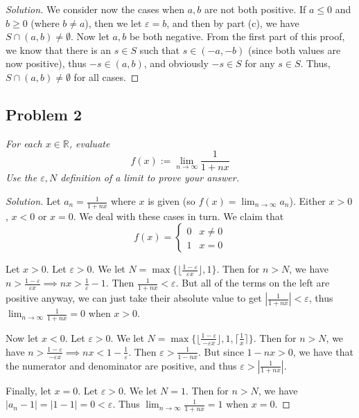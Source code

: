 \documentclass{article}
\newcommand{\R}{{\mathbb R}}
\newcommand{\ep}{{\varepsilon}}
\begin{document}
\begin{enumerate}
\begin{proof}[Solution]
		We consider now the cases when $a,b$ are not both positive.
		If $a \leq 0$ and $b \geq 0$ (where $b \neq a$),
		then we let $\ep = b$, and then by part (c),
		we have $S \cap (a,b) \neq \emptyset$.
		Now let $a,b$ be both negative.
		From the first part of this proof, we know that there is an $s \in S$
		such that $s \in (-a,-b)$ (since both values are now positive),
		thus $-s \in (a,b)$, and obviously $-s \in S$ for any $s \in S$.
		Thus, $S \cap (a,b) \neq \emptyset$ for all cases.

	\end{proof}
\end{enumerate}
\clearpage

\subsection*{Problem 2}
{\it For each $x \in \R$, evaluate
\[
	f(x) := \lim_{n\to\infty}\frac{1}{1+nx}
\]
Use the $\ep,N$ definition of a limit to prove your answer.}

\begin{proof}[Solution]\let\qed\relax
	Let $a_n = \frac{1}{1+nx}$ where $x$ is given
	(so $f(x) = \lim_{n\to\infty} a_n$).
	Either $x > 0$, $x < 0$ or $x = 0$.
	We deal with these cases in turn.
	We claim that
	\[
		f(x) = \begin{cases}
			0 & x\neq0\\
			1 & x = 0
		\end{cases}
	\]

	Let $x > 0$. Let $\ep > 0$.
	We let $N = \max\{\lfloor\frac{1-\ep}{\ep x}\rfloor,1\}$.
	Then for $n > N$, we have
	$n > \frac{1-\ep}{\ep x} \implies nx > \frac{1}{\ep}-1$.
	Then $\frac{1}{1+nx} < \ep$.
	But all of the terms on the left are positive anyway,
	we can just take their absolute value to get $|\frac{1}{1+nx}| < \ep$,
	thus $\lim_{n\to\infty}\frac{1}{1+nx} = 0$ when $x>0$.

	Now let $x < 0$. Let $\ep > 0$.
	We let $N = \max\{\lfloor\frac{1-\ep}{-\ep x}\rfloor, 1, \lceil \frac{1}{x}\rceil\}$.
	Then for $n > N$, we have $n > \frac{1-\ep}{-\ep x} \implies  nx < 1 - \frac{1}{\ep}$.
	Then $\ep > \frac{1}{1-nx}$.
	But since $1 - nx > 0$, we have that the numerator and denominator are positive,
	and thus $\ep > \left|\frac{1}{1+nx}\right|$.

	Finally, let $x = 0$. Let $\ep > 0$.
	We let $N = 1$.
	Then for $n > N$, we have $|a_n - 1| = |1 - 1| = 0 < \ep$.
	Thus $\lim_{n\to\infty}\frac{1}{1+nx} = 1$ when $x = 0$.
\end{proof}
\clearpage
~\clearpage
\end{document}
